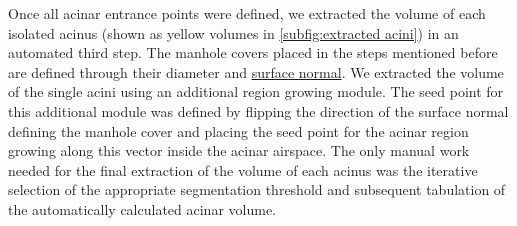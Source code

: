 \documentclass[paper=a4,abstract=true,english,DIV=calc]{scrartcl}
\begin{document}
Once all acinar entrance points were defined, we extracted the volume of each isolated acinus (shown as yellow volumes in \autoref{subfig:extracted acini}) in an automated third step.
The manhole covers placed in the steps mentioned before are defined through their diameter and \href{https://secure.wikimedia.org/wikipedia/en/w/index.php?title=Surface_normal&oldid=411684319}{surface normal}.
We extracted the volume of the single acini using an additional region growing module.
The seed point for this additional module was defined by flipping the direction of the surface normal defining the manhole cover and placing the seed point for the acinar region growing along this vector inside the acinar airspace.
The only manual work needed for the final extraction of the volume of each acinus was the iterative selection of the appropriate segmentation threshold and subsequent tabulation of the automatically calculated acinar volume.
\end{document}
